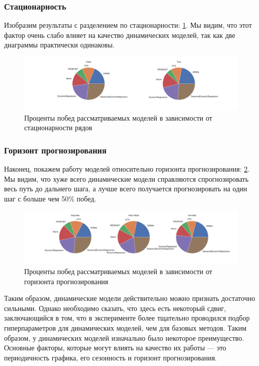\documentclass[a4paper,14pt]{extarticle}
\begin{document}
	\subsubsection{Стационарность}
	Изобразим результаты с разделением по стационарности: \ref{wins:stationary}. Мы видим, что этот фактор очень слабо влияет на качество динамических моделей, так как две диаграммы практически одинаковы.
	\begin{figure}[!h]
		\captionsetup{justification=centering}
		\centering
		\includegraphics[width=\linewidth]{pictures/wins-stationarity.pdf}
		\caption{Проценты побед рассматриваемых моделей в зависимости от стационарности рядов}
		\label{wins:stationary}
	\end{figure}
	\subsubsection{Горизонт прогнозирования}
	Наконец, покажем работу моделей относительно горизонта прогнозирования: \ref{wins:fh}. Мы видим, что хуже всего динамические модели справляются спрогнозировать весь путь до дальнего шага, а лучше всего получается прогнозировать на один шаг с больше чем 50\% побед.
	\begin{figure}[!h]
		\captionsetup{justification=centering}
		\centering
		\includegraphics[width=\linewidth]{pictures/wins-fh.pdf}
		\caption{Проценты побед рассматриваемых моделей в зависимости от горизонта прогнозирования}
		\label{wins:fh}
	\end{figure}

	Таким образом, динамические модели действительно можно признать достаточно сильными. Однако необходимо сказать, что здесь есть некоторый сдвиг, заключающийся в том, что в эксперименте более тщательно проводился подбор гиперпараметров для динамических моделей, чем для базовых методов. Таким образом, у динамических моделей изначально было некоторое преимущество. Основные факторы, которые могут влиять на качество их работы --- это периодичность графика, его сезонность и горизонт прогнозирования.
\end{document}
